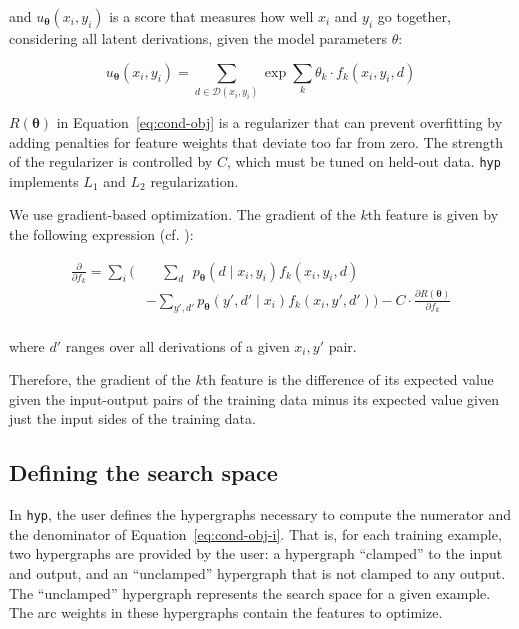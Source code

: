 \documentclass[12pt]{article}
\newcommand{\hyp}{\texttt{hyp}\xspace}
\newcommand{\vtheta}{\boldsymbol{\theta}}
\newcommand{\ptheta}{p_{\vtheta}}
\newcommand{\utheta}{u_{\vtheta}}
\renewcommand{\eqref}[1]{Equation~\ref{eq:#1}}
\let\newcite\citet %
\begin{document}
and $\utheta(x_i,y_i)$ is a score that measures how well $x_i$ and
$y_i$ go together, considering all latent derivations, given the model
parameters $\theta$:

\begin{equation}\label{eq:unnorm}
  \utheta(x_i,y_i) = \sum_{d\in\mathcal{D}(x_i,y_i)} \exp \sum_k \theta_k
  \cdot f_k(x_i,y_i,d)
\end{equation}

$R(\vtheta)$ in \eqref{cond-obj} is a regularizer that can prevent
overfitting by adding penalties for feature weights that deviate too
far from zero. The strength of the regularizer is controlled by $C$,
which must be tuned on held-out data. \hyp implements $L_1$ and $L_2$
regularization.

We use gradient-based optimization. The gradient of the $k$th feature
is given by the following expression (cf. \newcite{crftut:fnt}):

\begin{equation}
  \begin{array}{ll}
    \frac{\partial{}}{\partial{f_k}} = \sum_i ( & \ \ \ \ \ \sum_{d}\ \
    \ptheta(d \mid x_i, y_i) f_k(x_i, y_i, d) \\
    & - \sum_{y',d'}
    \ptheta(y', d' \mid x_i) f_k(x_i, y', d') )
    - C \cdot \frac{\partial{R(\vtheta)}}{\partial{f_k}}\\
  \end{array}
\end{equation}

where $d'$ ranges over all derivations of a given $x_i, y'$ pair.

Therefore, the gradient of the $k$th feature is the difference of its
expected value given the input-output pairs of the training data minus
its expected value given just the input sides of the training data.

\subsection{Defining the search space}\label{sec:defining}

In \hyp, the user defines the hypergraphs necessary to compute the
numerator and the denominator of \eqref{cond-obj-i}. That is, for each
training example, two hypergraphs are provided by the user: a
hypergraph ``clamped'' to the input and output, and an ``unclamped''
hypergraph that is not clamped to any output. The ``unclamped''
hypergraph represents the search space for a given example.  The arc
weights in these hypergraphs contain the features to optimize.
\end{document}
